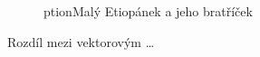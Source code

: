 \documentclass[a4paper, 11pt]{article}
\begin{document}
\begin{figure}[ht]
\begin{center}
ption{Malý Etiopánek a jeho bratříček} \label{pic1}
    \end{center}
\end{figure}

\pagebreak

Rozdíl mezi vektorovým \dots 
\end{document}
